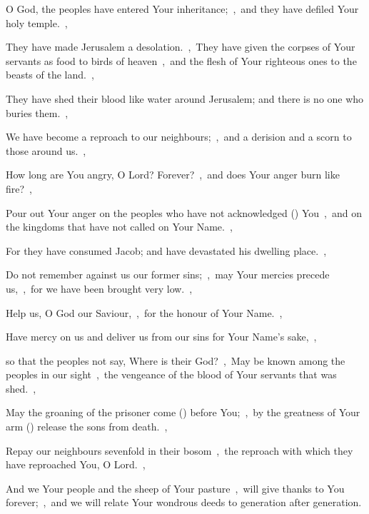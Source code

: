 \documentclass[12pt,twoside,a5paper]{article}
\begin{document}
\begin{normalparskip}
  O God, the peoples have entered Your inheritance;~\sep\ and they have defiled Your holy temple.~\sep


  They have made Jerusalem a desolation.~\sep\ They have given the corpses of Your servants as food to birds of heaven~\sep\ and the flesh of Your righteous ones to the beasts of the land.~\sep

  They have shed their blood like water around Jerusalem; and there is no one who buries them.~\sep

  We have become a reproach to our neighbours;~\sep\ and a derision and a scorn to those around us.~\sep

  How long are You angry, O Lord? Forever?~\sep\ and does Your anger burn like fire?~\sep

  Pour out Your anger on the peoples who have not acknowledged () You~\sep\ and on the kingdoms that have not called on Your Name.~\sep

  For they have consumed Jacob; and have devastated his dwelling place.~\sep

  Do not remember against us our former sins;~\sep\ may Your mercies precede us,~\sep\ for we have been brought very low.~\sep

  Help us, O God our Saviour,~\sep\ for the honour of Your Name.~\sep

  Have mercy on us and deliver us from our sins for Your Name's sake,~\sep

  so that the peoples not say, Where is their God?~\sep\ May be known among the peoples in our sight~\sep\ the vengeance of the blood of Your servants that was shed.~\sep

  May the groaning of the prisoner come () before You;~\sep\ by the greatness of Your arm () release the sons from death.~\sep

  Repay our neighbours sevenfold in their bosom~\sep\ the reproach with which they have reproached You, O Lord.~\sep

  And we Your people and the sheep of Your pasture~\sep\ will give thanks to You forever;~\sep\ and we will relate Your wondrous deeds to generation after generation.
\end{normalparskip}
\end{document}
